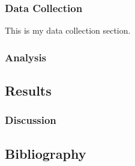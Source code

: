 \documentclass{article}
\begin{document}
\subsubsection{Data Collection}\label{data-collection}

This is my data collection section.

\subsubsection{Analysis}\label{analysis}

\subsection{Results}\label{results}

\subsubsection{Discussion}\label{discussion}

\subsection{Bibliography}\label{bibliography}
\end{document}
